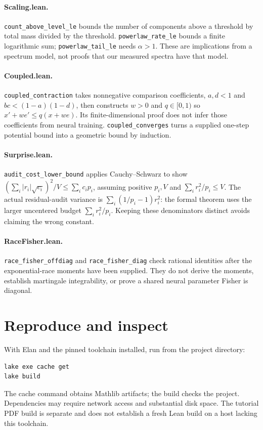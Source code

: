 \documentclass[11pt]{article}
\begin{document}
\paragraph{Scaling.lean.} \texttt{count\_\allowbreak{}above\_\allowbreak{}level\_\allowbreak{}le} bounds the number of components above a threshold by total mass divided by the threshold. \texttt{powerlaw\_\allowbreak{}rate\_\allowbreak{}le} bounds a finite logarithmic sum; \texttt{powerlaw\_\allowbreak{}tail\_\allowbreak{}le} needs $\alpha>1$. These are implications from a spectrum model, not proofs that our measured spectra have that model.
\paragraph{Coupled.lean.} \texttt{coupled\_\allowbreak{}contraction} takes nonnegative comparison coefficients, $a,d<1$ and $bc<(1-a)(1-d)$, then constructs $w>0$ and $q\in[0,1)$ so $x'+we'\le q(x+we)$. Its finite-dimensional proof does not infer those coefficients from neural training. \texttt{coupled\_\allowbreak{}converges} turns a supplied one-step potential bound into a geometric bound by induction.
\paragraph{Surprise.lean.} \texttt{audit\_\allowbreak{}cost\_\allowbreak{}lower\_\allowbreak{}bound} applies Cauchy--Schwarz to show
$(\sum_i|r_i|\sqrt{c_i})^2/V\le\sum_ic_ip_i$, assuming positive $p_i,V$ and $\sum_ir_i^2/p_i\le V$. The actual residual-audit variance is $\sum_i(1/p_i-1)r_i^2$: the formal theorem uses the larger uncentered budget $\sum_ir_i^2/p_i$. Keeping these denominators distinct avoids claiming the wrong constant.
\paragraph{RaceFisher.lean.} \texttt{race\_\allowbreak{}fisher\_\allowbreak{}offdiag} and \texttt{race\_\allowbreak{}fisher\_\allowbreak{}diag} check rational identities after the exponential-race moments have been supplied. They do not derive the moments, establish martingale integrability, or prove a shared neural parameter Fisher is diagonal.
\section{Reproduce and inspect}
With Elan and the pinned toolchain installed, run from the project directory:
\begin{verbatim}
lake exe cache get
lake build
\end{verbatim}
The cache command obtains Mathlib artifacts; the build checks the project. Dependencies may require network access and substantial disk space. The tutorial PDF build is separate and does not establish a fresh Lean build on a host lacking this toolchain.
\end{document}
